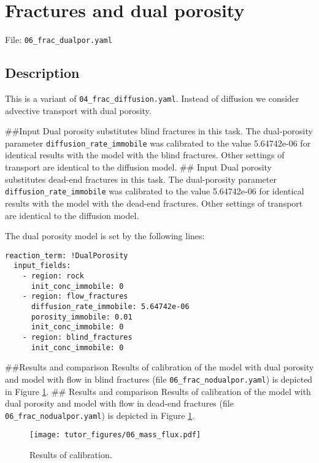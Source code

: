 \section{Fractures and dual porosity}

File: \texttt{06\_frac\_dualpor.yaml}

\subsection{Description}

This is a variant of \texttt{04\_frac\_diffusion.yaml}. Instead of
diffusion we consider advective transport with dual porosity.

\#\#Input Dual porosity substitutes blind fractures in this task. The
dual-porosity parameter \texttt{diffusion\_rate\_immobile} was
calibrated to the value 5.64742e-06 for identical results with the model
with the blind fractures. Other settings of transport are identical to
the diffusion model. \#\# Input Dual porosity substitutes dead-end
fractures in this task. The dual-porosity parameter
\texttt{diffusion\_rate\_immobile} was calibrated to the value
5.64742e-06 for identical results with the model with the dead-end
fractures. Other settings of transport are identical to the diffusion
model.

The dual porosity model is set by the following lines:

\begin{verbatim}
reaction_term: !DualPorosity
  input_fields:
    - region: rock
      init_conc_immobile: 0
    - region: flow_fractures
      diffusion_rate_immobile: 5.64742e-06
      porosity_immobile: 0.01
      init_conc_immobile: 0
    - region: blind_fractures
      init_conc_immobile: 0
\end{verbatim}

\#\#Results and comparison Results of calibration of the model with dual
porosity and model with flow in blind fractures (file
\texttt{06\_frac\_nodualpor.yaml}) is depicted in Figure
\ref{fig:calib}. \#\# Results and comparison Results of calibration of
the model with dual porosity and model with flow in dead-end fractures
(file \texttt{06\_frac\_nodualpor.yaml}) is depicted in Figure
\ref{fig:calib}.

\begin{figure}
\hypertarget{fig:calib}{%
\centering
\texttt{[image: tutor\_figures/06\_mass\_flux.pdf]}
\caption{Results of calibration.}\label{fig:calib}
}
\end{figure}
